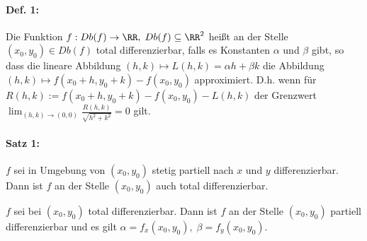 \paragraph{Def. 1:} Die Funktion $f: Db(f) \to \RR, \; Db(f) \subseteq \RR^2$ heißt an der Stelle $(x_0,y_0)\in Db(f)$ total differenzierbar, falls es Konstanten $\alpha$ und $\beta$ gibt, so dass die lineare Abbildung $(h,k) \mapsto L(h,k) = \alpha h + \beta k$ die Abbildung $(h,k) \mapsto f(x_0 +h, y_0 + k) - f(x_0,y_0) $ approximiert. D.h. wenn für $R(h,k):= f(x_0+h, y_0 +k) - f(x_0,y_0) - L(h,k)$ der Grenzwert $\lim_{(h,k)\to (0,0)} \frac{R(h,k)}{\sqrt{h^2+k^2}}=0$ gilt.

\paragraph{Satz 1:}
\begin{anumerate}
\item $f$ sei in Umgebung von $(x_0, y_0)$ stetig partiell nach $x$ und $y$ differenzierbar. Dann ist $f$ an der Stelle $(x_0,y_0)$ auch total differenzierbar.
\item $f$ sei bei $(x_0,y_0)$ total differenzierbar. Dann ist $f$ an der Stelle $(x_0,y_0)$ partiell differenzierbar und es gilt $\alpha = f_x(x_0,y_0), \; \beta = f_y(x_0,y_0)$.
\end{anumerate}


